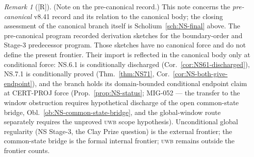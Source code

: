 \documentclass[12pt,oneside]{amsbook}
\theoremstyle{plain}
\theoremstyle{definition}
\theoremstyle{remark}
\newtheorem{remark}[theorem]{Remark}
\newcommand{\status}[1]{\textup{[#1]}}
\begin{document}
\begin{remark}[\status{R}]\label{rem:NS-precanonical-completeness}
\textup{(Note on the pre-canonical record.)} This note concerns the
\emph{pre-canonical} v8.41 record and its relation to the canonical
body; the closing assessment of the canonical branch itself is
Scholium~\ref{sch:NS-final} above.
The pre-canonical program recorded derivation sketches for the
boundary-order and Stage-3 predecessor program. Those sketches have
no canonical force and do not define the present frontier. Their
import is reflected in the canonical body only at conditional force:
NS.6.1 is conditionally discharged
(Cor.~\ref{cor:NS61-discharged}), NS.7.1 is conditionally proved
(Thm.~\ref{thm:NS71}, Cor.~\ref{cor:NS-both-give-endpoint}), and the
branch holds its domain-bounded conditional endpoint claim at
CERT-PROJ force (Prop.~\ref{prop:NS-status}; MIG-052 --- the
transfer to the window obstruction requires hypothetical discharge
of the open common-state bridge,
Obl.~\ref{ob:NS-common-state-bridge}, and the global-window route
separately requires the unproved \textsc{uwb} scope hypothesis).
Unconditional global regularity (NS Stage-3, the Clay Prize
question) is the external frontier; the common-state bridge is the
formal internal frontier; \textsc{uwb} remains outside the frontier
counts.
\end{remark}
\end{document}

